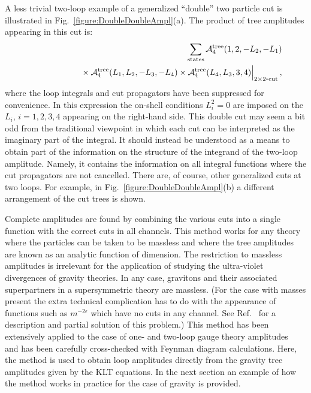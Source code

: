 \documentclass[12pt]{livrev}
\begin{document}
A less trivial two-loop example of a generalized ``double'' two particle
cut is illustrated in Fig.~\ref{figure:DoubleDoubleAmpl}(a).
The product of tree amplitudes appearing in this cut is:
%
\begin{eqnarray}
&&
\sum_{\rm states} {\cal A}_4^{\rm tree}(1,2, -L_2, -L_1)  \nonumber \\
&& \hskip 1.8 cm 
\null \times {\cal A}_4^{\rm tree}(L_1, L_2, -L_3, -L_4)
\null \times {\cal A}_4^{\rm tree}(L_4, L_3, 3, 4) 
 \Bigr|_{\rm 2\times2\hbox{\small -} cut} \,, 
\label{DoubleDoubleCut}
\end{eqnarray}
%
where the loop integrals and cut propagators have been suppressed for
convenience.  In this expression the on-shell conditions
$L_i^2 = 0$ are imposed on the $L_i$, $i=1,2,3,4$ appearing on the
right-hand side. This double cut
may seem a bit odd from the traditional viewpoint in which each 
cut can be interpreted as the imaginary part of the integral.
It should instead be understood as a means to obtain part
of the information on the structure of the integrand of the two-loop
amplitude.  Namely, it contains the information on all integral
functions where the cut propagators are not cancelled. 
 There are, of
course, other generalized cuts at two loops.  For example, in
Fig.~\ref{figure:DoubleDoubleAmpl}(b) a different arrangement of the
cut trees is shown.

Complete amplitudes are found by combining the various cuts into a
single function with the correct cuts in all channels.  This method
works for any theory where the particles can be taken to be
massless and where the tree amplitudes are known as an analytic
function of dimension.  The restriction to massless amplitudes is
irrelevant for the application of studying the ultra-violet
divergences of gravity theories.  In any case, gravitons and their
associated superpartners in a supersymmetric theory are massless.
(For the case with masses present the extra technical complication has
to do with the appearance of functions such as $m^{-2\epsilon}$ which
have no cuts in any channel. See Ref.~\cite{BernMorgan} for a
description and partial solution of this problem.)  This method has been
extensively applied to the case of one- and two-loop gauge theory
amplitudes~\cite{Bern94SusyFour,Bern95SusyFour,Review,Bern00QCDApplications,
Bern02QCDApplications} and has been carefully cross-checked with Feynman
diagram calculations.  Here, the method is used to obtain loop
amplitudes directly from the gravity tree amplitudes given by the KLT
equations.  In the next section an example of how the method works in
practice for the case of gravity is provided.
\end{document}
